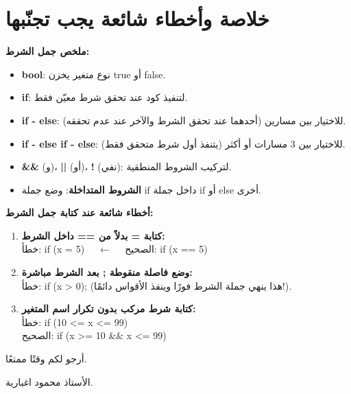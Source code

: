 \documentclass[14pt]{extarticle}
\begin{document}
\section{خلاصة وأخطاء شائعة يجب تجنّبها}

\begin{boxNote}
\textbf{ملخص جمل الشرط:}
\begin{itemize}
    \item \textbf{\textenglish{bool}}: نوع متغير يخزن \textenglish{true} أو \textenglish{false}.
    \item \textbf{\textenglish{if}}: لتنفيذ كود عند تحقق شرط معيّن فقط.
    \item \textbf{\textenglish{if - else}}: للاختيار بين مسارين (أحدهما عند تحقق الشرط والآخر عند عدم تحققه).
    \item \textbf{\textenglish{if - else if - else}}: للاختيار بين 3 مسارات أو أكثر (يتنفذ أول شرط متحقق فقط).
    \item \textbf{\textenglish{\&\&}} (و)، \textbf{\textenglish{||}} (أو)، \textbf{\textenglish{!}} (نفي): لتركيب الشروط المنطقية.
    \item \textbf{الشروط المتداخلة}: وضع جملة \textenglish{if} داخل جملة \textenglish{if} أو \textenglish{else} أخرى.
\end{itemize}
\end{boxNote}

\begin{boxWarning}
\textbf{أخطاء شائعة عند كتابة جمل الشرط:}
\begin{enumerate}
    \item \textbf{كتابة \textenglish{=} بدلاً من \textenglish{==} داخل الشرط:} \\
    خطأ: \textenglish{if (x = 5)} $\quad \leftarrow \quad$ الصحيح: \textenglish{if (x == 5)}
    \item \textbf{وضع فاصلة منقوطة \textenglish{;} بعد الشرط مباشرة:} \\
    خطأ: \textenglish{if (x > 0);} (هذا ينهي جملة الشرط فورًا وينفذ الأقواس دائمًا!).
    \item \textbf{كتابة شرط مركب بدون تكرار اسم المتغير:} \\
    خطأ: \textenglish{if (10 <= x <= 99)} \\
    الصحيح: \textenglish{if (x >= 10 \&\& x <= 99)}
\end{enumerate}
\end{boxWarning}

\vspace{1cm}
\begin{flushleft}
أرجو لكم وقتًا ممتعًا.

الأستاذ محمود اغبارية.
\end{flushleft}
\end{document}
